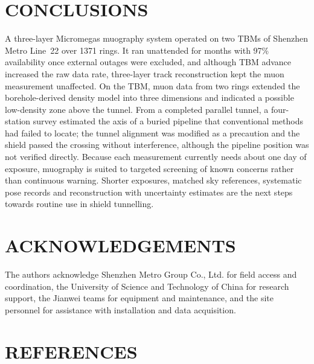 \documentclass{WTC2027}
\begin{document}
\section{CONCLUSIONS}
A three-layer Micromegas muography system operated on two TBMs of Shenzhen Metro Line~22 over 1371 rings. It ran unattended for months with 97\% availability once external outages were excluded, and although TBM advance increased the raw data rate, three-layer track reconstruction kept the muon measurement unaffected. On the TBM, muon data from two rings extended the borehole-derived density model into three dimensions and indicated a possible low-density zone above the tunnel. From a completed parallel tunnel, a four-station survey estimated the axis of a buried pipeline that conventional methods had failed to locate; the tunnel alignment was modified as a precaution and the shield passed the crossing without interference, although the pipeline position was not verified directly. Because each measurement currently needs about one day of exposure, muography is suited to targeted screening of known concerns rather than continuous warning. Shorter exposures, matched sky references, systematic pose records and reconstruction with uncertainty estimates are the next steps towards routine use in shield tunnelling.

\section*{ACKNOWLEDGEMENTS}
The authors acknowledge Shenzhen Metro Group Co., Ltd. for field access and coordination, the University of Science and Technology of China for research support, the Jianwei teams for equipment and maintenance, and the site personnel for assistance with installation and data acquisition.

\section*{REFERENCES}
\printbibliography[heading=none]
\end{document}
